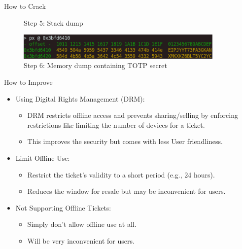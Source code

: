 \documentclass[final,dvipsnames]{beamer}
\newlength{\sepwidth}
\newlength{\colwidth}
\newcommand{\separatorcolumn}{\begin{column}{\sepwidth}\end{column}}
\begin{document}
\begin{frame}[t, fragile]
\begin{columns}[t]
\begin{column}{\colwidth}
\begin{block}{How to Crack}
\begin{figure}[h]
            \caption{Step 5: Stack dump}
            \label{fig:HackingStep5}
        \end{figure}
        \begin{figure}[h]
            \centering
            \includegraphics[width=0.95\textwidth]{../figures/Hacking_step_6.png}
            \caption{Step 6: Memory dump containing TOTP secret}
            \label{fig:HackingStep6}
        \end{figure}
        
    \end{block}
    \begin{block}{How to Improve}
        \begin{itemize}
            \item Using Digital Rights Management (DRM):
            \begin{itemize}
                \item DRM restricts offline access and prevents sharing/selling by enforcing restrictions like limiting the number of devices for a ticket.
                \item This improves the security but comes with less User friendliness.
            \end{itemize}
            \item Limit Offline Use:
            \begin{itemize}
                \item Restrict the ticket’s validity to a short period (e.g., 24 hours). 
                \item Reduces the window for resale but may be inconvenient for users.
            \end{itemize}
            \item Not Supporting Offline Tickets:
            \begin{itemize}
                \item Simply don't allow offline use at all.
                \item Will be very inconvenient for users.
            \end{itemize}
        \end{itemize}
    \end{block}
    

\end{column}




\separatorcolumn
\end{columns}
\end{frame}
\end{document}
